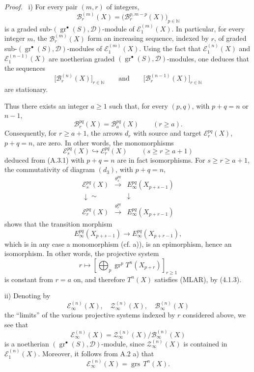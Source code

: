 \documentclass[11pt]{article}
\newenvironment{prooftext}[1][Proof]{\par\noindent\emph{#1.}\ }{\par\medskip}
\providecommand{\gr}{\operatorname{gr}}
\providecommand{\gr}{\operatorname{gr}}
\providecommand{\gr}{\operatorname{gr}}
\providecommand{\grs}{\operatorname{grs}}
\begin{document}
\begin{prooftext}
i) For every pair \((m,r)\) of integers,
\[
\mathcal B_r^{(m)}(X)=\bigl(\mathcal B_r^{p,m-p}(X)\bigr)_{p\in\mathbb N}
\]
is a graded sub-\((\gr^\bullet(S),\mathcal D)\)-module of \(\mathcal E_1^{(m)}(X)\). In particular, for every integer \(m\), the \(\mathcal B_r^{(m)}(X)\) form an increasing sequence, indexed by \(r\), of graded sub-\((\gr^\bullet(S),\mathcal D)\)-modules of \(\mathcal E_1^{(m)}(X)\). Using the fact that \(\mathcal E_1^{(n)}(X)\) and \(\mathcal E_1^{(n-1)}(X)\) are noetherian graded \((\gr^\bullet(S),\mathcal D)\)-modules, one deduces that the sequences
\[
\bigl[\mathcal B_r^{(n)}(X)\bigr]_{r\in\mathbb N}
\qquad\text{and}\qquad
\bigl[\mathcal B_r^{(n-1)}(X)\bigr]_{r\in\mathbb N}
\]
are stationary.

Thus there exists an integer \(a\ge1\) such that, for every \((p,q)\), with \(p+q=n\) or \(n-1\),
\begin{equation}
\mathcal B_r^{pq}(X)=\mathcal B_a^{pq}(X)\qquad(r\ge a).
\tag{A.3.1}
\end{equation}
Consequently, for \(r\ge a+1\), the arrows \(d_r\) with source and target \(\mathcal E_r^{pq}(X)\), \(p+q=n\), are zero. In other words, the monomorphisms
\[
\mathcal E_s^{pq}(X)\hookrightarrow\mathcal E_r^{pq}(X)\qquad(s\ge r\ge a+1)
\]
deduced from (A.3.1) with \(p+q=n\) are in fact isomorphisms. For \(s\ge r\ge a+1\), the commutativity of diagram \((d_3)\), with \(p+q=n\),
\[
\begin{array}{ccc}
\mathcal E_s^{pq}(X)&\xrightarrow{\theta_s^{pq}}&E_\infty^{pq}(X_{p+s-1})\\
\downarrow\sim&&\downarrow\\
\mathcal E_r^{pq}(X)&\xrightarrow{\theta_r^{pq}}&E_\infty^{pq}(X_{p+r-1})
\end{array}
\]
shows that the transition morphism
\[
E_\infty^{pq}(X_{p+s-1})\longrightarrow E_\infty^{pq}(X_{p+r-1}),
\]
which is in any case a monomorphism (cf. a)), is an epimorphism, hence an isomorphism. In other words, the projective system
\[
r\longmapsto\left[\bigoplus_p\gr^p T^n(X_{p+r})\right]_{r\ge1}
\]
is constant from \(r=a\) on, and therefore \(T^n(X)\) satisfies (MLAR), by (4.1.3).

ii) Denoting by
\[
\mathcal E_\infty^{(n)}(X),\quad
\mathcal Z_\infty^{(n)}(X),\quad
\mathcal B_\infty^{(n)}(X)
\]
the “limits” of the various projective systems indexed by \(r\) considered above, we see that
\[
\mathcal E_\infty^{(n)}(X)=
\mathcal Z_\infty^{(n)}(X)/\mathcal B_\infty^{(n)}(X)
\]
is a noetherian \((\gr^\bullet(S),\mathcal D)\)-module, since \(\mathcal Z_\infty^{(n)}(X)\) is contained in \(\mathcal E_1^{(n)}(X)\). Moreover, it follows from A.2 a) that
\[
\mathcal E_\infty^{(n)}(X)=\grs\,T^n(X).
\]
\end{prooftext}
\end{document}
